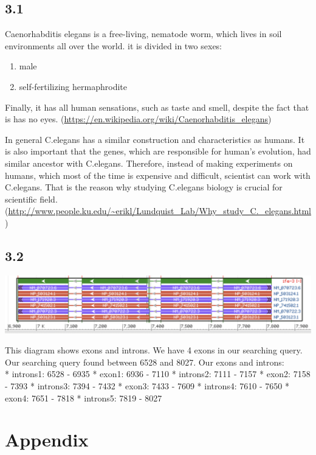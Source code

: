 \documentclass[]{article}
\providecommand{\tightlist}{%
  \setlength{\itemsep}{0pt}\setlength{\parskip}{0pt}}
\begin{document}
\subsection{3.1}\label{section-5}

Caenorhabditis elegans is a free-living, nematode worm, which lives in
soil environments all over the world. it is divided in two sexes:

\begin{enumerate}
\def\labelenumi{\roman{enumi})}
\tightlist
\item
  male
\item
  self-fertilizing hermaphrodite
\end{enumerate}

Finally, it has all human sensations, such as taste and smell, despite
the fact that is has no eyes.
(\url{https://en.wikipedia.org/wiki/Caenorhabditis_elegans})

In general C.elegans has a similar construction and characteristics as
humans. It is also important that the genes, which are responsible for
human's evolution, had similar ancestor with C.elegans. Therefore,
instead of making experiments on humans, which most of the time is
expensive and difficult, scientist can work with C.elegans. That is the
reason why studying C.elegans biology is crucial for scientific field.
(\url{http://www.people.ku.edu/~erikl/Lundquist_Lab/Why_study_C._elegans.html})

\subsection{3.2}\label{section-6}

\includegraphics[width=18.86in]{images/3.2_exons}

This diagram shows exons and introns. We have 4 exons in our searching
query. Our searching query found between 6528 and 8027. Our exons and
introns:\\
* introns1: 6528 - 6935 * exon1: 6936 - 7110 * introns2: 7111 - 7157 *
exon2: 7158 - 7393 * introns3: 7394 - 7432 * exon3: 7433 - 7609 *
introns4: 7610 - 7650 * exon4: 7651 - 7818 * introns5: 7819 - 8027

\section{Appendix}\label{appendix}
\end{document}
